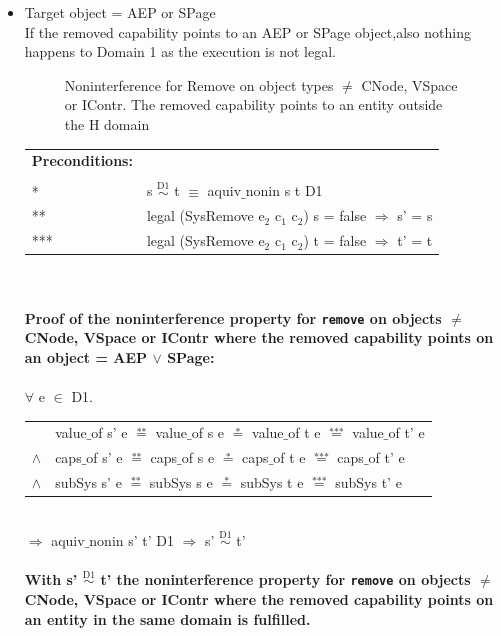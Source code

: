 \documentclass[11pt,a4paper,twoside]{article}
\begin{document}
{\begin{itemize}
\begin{tabular}{ll}
\end{tabular} \\
$\Rightarrow$ aquiv$\_$nonin s' t' D1 $\Rightarrow$ s' $\overset{\text{D1}}{\sim}$ t' \\ \\
\textbf{With s' $\overset{\text{D1}}{\sim}$ t' the noninterference property for \texttt{remove} on objects $\neq$ CNode, VSpace and ICont where the removed capability points on an entity in the same domain is fulfilled.}  
\clearpage
\item Target object = AEP or SPage \\
If the removed capability points to an AEP or SPage object,also nothing happens to Domain 1 as the execution is not legal. 
\begin{flushleft}
\begin{figure}[H]
\caption{Noninterference for Remove on object types $\neq$ CNode, VSpace or IContr. The removed capability points to an entity outside the H domain}
\label{fig:RemoveOutside2}
\end{figure}
\end{flushleft}
\begin{tabular}{ll}
\textbf{Preconditions:} \\ \\
* & s $\overset{\text{D1}}{\sim}$ t $\equiv$ aquiv$\_$nonin s t D1	\\ 
** & legal (SysRemove e$_2$ c$_1$ c$_2$) s = false $\Rightarrow$ s' = s \\ 
*** & legal (SysRemove e$_2$ c$_1$ c$_2$) t = false $\Rightarrow$ t' = t
\end{tabular} \\ \\ 
\textbf{Proof of the noninterference property for \texttt{remove} on objects $\neq$ CNode, VSpace or IContr where the removed capability points on an object = AEP $\vee$ SPage:}\\ \\
$\forall$ e $\in$ D1. \\
\begin{tabular}{ll}
& value$\_$of s' e $\overset{\text{**}}{=}$ value$\_$of s e $\overset{\text{*}}{=}$ value$\_$of t e $\overset{\text{***}}{=}$ value$\_$of t' e \\
$\wedge$ & caps$\_$of s' e $\overset{\text{**}}{=}$ caps$\_$of s e $\overset{\text{*}}{=}$ caps$\_$of t e $\overset{\text{***}}{=}$ caps$\_$of t' e \\
$\wedge$ & subSys s' e $\overset{\text{**}}{=}$ subSys s e $\overset{\text{*}}{=}$ subSys t e $\overset{\text{***}}{=}$ subSys t' e
\end{tabular} \\
$\Rightarrow$ aquiv$\_$nonin s' t' D1 $\Rightarrow$ s' $\overset{\text{D1}}{\sim}$ t' \\ \\
\textbf{With s' $\overset{\text{D1}}{\sim}$ t' the noninterference property for \texttt{remove} on objects $\neq$ CNode, VSpace or IContr where the removed capability points on an entity in the same domain is fulfilled.}  
\clearpage
\end{itemize}
}
\end{document}
